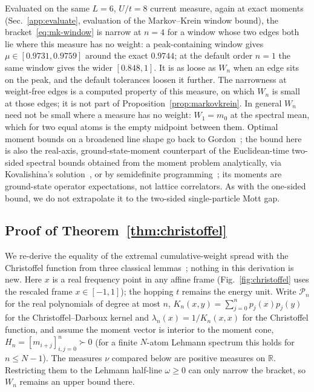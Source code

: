 \documentclass[aps,prb,onecolumn,superscriptaddress,longbibliography,floatfix]{revtex4-2}
\begin{document}
Evaluated on the same $L=6$, $U/t=8$ current measure, again at exact moments (Sec.~\ref{app:evaluate}, evaluation of the Markov--Krein window bound), the bracket~\eqref{eq:mk-window} is narrow at $n=4$ for a window whose two edges both lie where this measure has no weight: a peak-containing window gives $\mu\in[0.9731,0.9759]$ around the exact $0.9744$; at the default order $n=1$ the same window gives the wider $[0.848,1]$. It is as loose as $W_n$ when an edge sits on the peak, and the default tolerances loosen it further. The narrowness at weight-free edges is a computed property of this measure, on which $W_n$ is small at those edges; it is not part of Proposition~\ref{prop:markovkrein}. In general $W_n$ need not be small where a measure has no weight: $W_1=m_0$ at the spectral mean, which for two equal atoms is the empty midpoint between them. Optimal moment bounds on a broadened line shape go back to Gordon~\cite{Gordon1968}; the bound here is also the real-axis, ground-state-moment counterpart of the Euclidean-time two-sided spectral bounds obtained from the moment problem analytically, via Kovalishina's solution~\cite{AbbottJayOare2025}, or by semidefinite programming~\cite{CausalBootstrap2026,CertifiedSpectral2026}; its moments are ground-state operator expectations, not lattice correlators. As with the one-sided bound, we do not extrapolate it to the two-sided single-particle Mott gap.

\subsection*{Proof of Theorem~\ref{thm:christoffel}}
We re-derive the equality of the extremal cumulative-weight spread with the Christoffel function from three classical lemmas~\cite{Akhiezer1965,KreinNudelman1977,GM2010}; nothing in this derivation is new. Here $x$ is a real frequency point in any affine frame (Fig.~\ref{fig:christoffel} uses the rescaled frame $x\in[-1,1]$); the hopping $t$ remains the energy unit. Write $\mathcal{P}_n$ for the real polynomials of degree at most $n$, $K_n(x,y)=\sum_{j=0}^{n}p_j(x)p_j(y)$ for the Christoffel--Darboux kernel and $\lambda_n(x)=1/K_n(x,x)$ for the Christoffel function, and assume the moment vector is interior to the moment cone, $H_n=[m_{i+j}]_{i,j=0}^{n}\succ 0$ (for a finite $N$-atom Lehmann spectrum this holds for $n\le N-1$). The measures $\nu$ compared below are positive measures on $\mathbb{R}$. Restricting them to the Lehmann half-line $\omega\ge0$ can only narrow the bracket, so $W_n$ remains an upper bound there.
\end{document}
